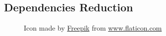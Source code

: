 \subsection{Dependencies Reduction}
\label{subsec:introduction_principles_dependencies_reduction}

\begin{figure} %
  \centering
  \def\stackalignment{l} %
  {\scriptsize \parbox[t]{\linewidth}{ Icon made by \href{https://www.flaticon.com/authors/freepik}{Freepik} from \href{http://www.flaticon.com}{www.flaticon.com} }}
\end{figure}

